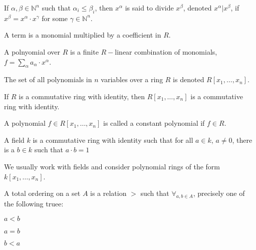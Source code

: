             \begin{definition}
                If $\alpha,\beta \in \mathbb{N}^n$ such that
                $\alpha_i \leq \beta_i$, then $x^{\alpha}$ is said
                to divide $x^\beta$, denoted $x^\alpha \vert x^\beta$,
                if $x^\beta = x^\alpha \cdot x^\gamma$ for some
                $\gamma\in\mathbb{N}^n$.
            \end{definition}
            \begin{definition}
                A term is a monomial multiplied by a coefficient in $R$.
            \end{definition}
            \begin{definition}
                A polnyomial over $R$ is a finite $R-$linear
                combination of monomials,
                $f=\sum_{\alpha} a_{\alpha}\cdot x^{\alpha}$.
            \end{definition}
            \begin{notation}
                The set of all polynomials in $n$ variables over
                a ring $R$ is denoted $R[x_1,\hdots, x_n]$.
            \end{notation}
            \begin{theorem}
                If $R$ is a commutative ring with identity,
                then $R[x_1,\hdots, x_n]$ is a commutative
                ring with identity.
            \end{theorem}
            \begin{definition}
                A polynomial $f\in R[x_1,\hdots, x_n]$ is
                called a constant polynomial if $f\in R$.
            \end{definition}
            \begin{definition}
                A field $k$ is a commutative ring with identity
                such that for all $a\in k$, $a\ne 0$, there is a
                $b\in k$ such that $a\cdot b=1$
            \end{definition}
            \begin{remark}
                We usually work with fields and consider
                polynomial rings of the form $k[x_1,\hdots ,x_n]$.
            \end{remark}
            \begin{definition}
                A total ordering on a set $A$ is a relation
                $>$ such that $\forall_{a,b\in A}$, precisely one
                of the following truee:
                \begin{enumerate}
                    \begin{multicols}{3}
                        \item $a<b$
                        \item $a=b$
                        \item $b<a$
                    \end{multicols}
                \end{enumerate}
            \end{definition}
